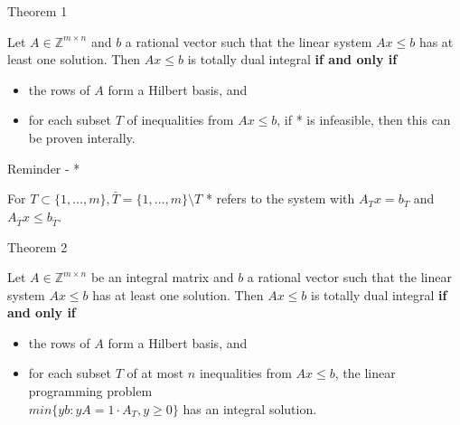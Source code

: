 \documentclass{beamer}
\begin{document}
\begin{frame}

	\begin{block}{Theorem 1}

		Let $A\in \mathbb{Z}^{m \times n}$ and $b$ a rational vector such that the linear system $Ax \leq b$ has at least one solution. Then $Ax \leq b$ is totally dual integral \textbf{if and only if}\\

		\begin{itemize}

			\item the rows of $A$ form a Hilbert basis, and

			\item for each subset $T$ of inequalities from $Ax\leq b$, if * is infeasible, then this can be proven interally.

		\end{itemize}

	\end{block}

	\begin{block}{Reminder - *}

		For $T\subset \{ 1, \dots, m\}, \bar{T} = \{1, \dots, m \} \setminus T$ * refers to the system with $A_T x= b_T$ and $A_{\bar{T}}x\leq b_{\bar{T}}$.

	\end{block}

\end{frame}

\begin{frame}

	\begin{block}{Theorem 2}

		Let $A\in \mathbb{Z}^{m \times n}$ be an integral matrix and $b$ a rational vector such that the linear system $Ax \leq b$ has at least one solution. Then $Ax \leq b$ is totally dual integral \textbf{if and only if}\\

		\begin{itemize}

			\item the rows of $A$ form a Hilbert basis, and

			\item for each subset $T$ of at most $n$ inequalities from $Ax\leq b$, the linear programming problem \\
			$min\{yb: yA=1\cdot A_T, y\geq 0 \}$ has an integral solution.

		\end{itemize}

	\end{block}

\end{frame}
\end{document}
